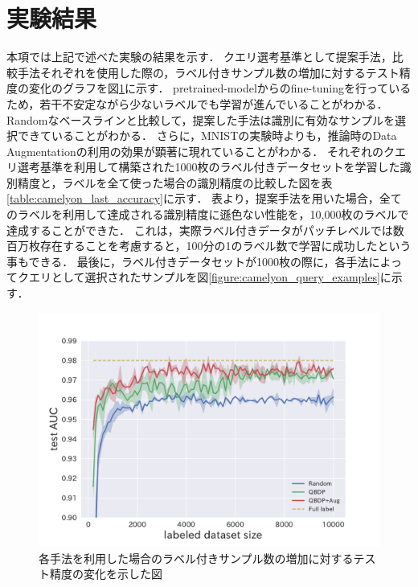 \section{実験結果}
本項では上記で述べた実験の結果を示す．
クエリ選考基準として提案手法，比較手法それぞれを使用した際の，ラベル付きサンプル数の増加に対するテスト精度の変化のグラフを図\ref{fig:camelyon_acc_graph}に示す．
pretrained-modelからのfine-tuningを行っているため，若干不安定ながら少ないラベルでも学習が進んでいることがわかる．
Randomなベースラインと比較して，提案した手法は識別に有効なサンプルを選択できていることがわかる．
さらに，MNISTの実験時よりも，推論時のData Augmentationの利用の効果が顕著に現れていることがわかる．
それぞれのクエリ選考基準を利用して構築された1000枚のラベル付きデータセットを学習した識別精度と，ラベルを全て使った場合の識別精度の比較した図を表\ref{table:camelyon_last_accuracy}に示す．
表より，提案手法を用いた場合，全てのラベルを利用して達成される識別精度に遜色ない性能を，10,000枚のラベルで達成することができた．
これは，実際ラベル付きデータがパッチレベルでは数百万枚存在することを考慮すると，100分の1のラベル数で学習に成功したという事もできる．
最後に，ラベル付きデータセットが1000枚の際に，各手法によってクエリとして選択されたサンプルを図\ref{figure:camelyon_query_examples}に示す．

\begin{figure}[tbp]
     \begin{center}
      \includegraphics[width=12cm]{figures/camelyon_acc_graph.pdf}
     \end{center}
    \label{fig:camelyon_acc_graph}
    \caption{各手法を利用した場合のラベル付きサンプル数の増加に対するテスト精度の変化を示した図}
\end{figure}

